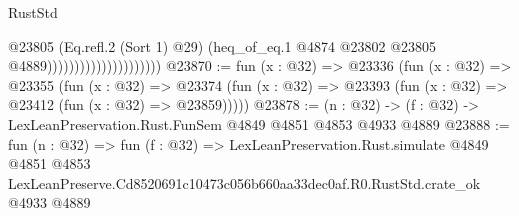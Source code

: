 \begin{lexlean}{RustStd}
\begin{coremodule}
                                            @23805
                                            (Eq.refl.{2} (Sort 1) @29)
                                            (heq_of_eq.{1}
                                              @4874
                                              @23802
                                              @23805
                                              @4889)))))))))))))))))))))
@23870 := fun (x : @32) =>
  @23336
    (fun (x : @32) =>
    @23355
      (fun (x : @32) =>
      @23374 (fun (x : @32) => @23393 (fun (x : @32) => @23412 (fun (x : @32) => @23859)))))
@23878 := (n : @32) -> (f : @32) -> LexLeanPreservation.Rust.FunSem @4849 @4851 @4853 @4933 @4889
@23888 := fun (n : @32) =>
  fun (f : @32) =>
  LexLeanPreservation.Rust.simulate
    @4849
    @4851
    @4853
    LexLeanPreserve.Cd8520691c10473c056b660aa33dec0af.R0.RustStd.crate_ok
    @4933
    @4889
\end{coremodule}
\end{lexlean}

